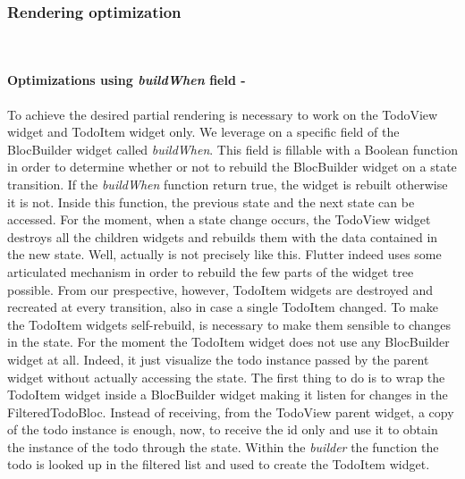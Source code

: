 \subsubsection{Rendering optimization}  \label{par:todo_app_inherited_widget_introduction}
\hfill\\
\paragraph{Optimizations using \textit{buildWhen }field - }\label{subpar:todo_app_bloc_core_state}
To achieve the desired partial rendering is necessary to work on the TodoView widget and TodoItem widget only. We leverage on a specific field of the BlocBuilder widget called \textit{buildWhen}. This field is fillable with a Boolean function in order to determine whether or not to rebuild the BlocBuilder widget on a state transition. If the \textit{buildWhen} function return true, the widget is rebuilt otherwise it is not. Inside this function,  the previous state and the next state can be accessed. For the moment, when a state change occurs, the TodoView widget destroys all the children widgets and rebuilds them with the data contained in the new state. Well, actually is not precisely like this. Flutter indeed uses some articulated mechanism in order to rebuild the few parts of the widget tree possible. From our prespective, however, TodoItem widgets are destroyed and recreated at every transition, also in case a single TodoItem changed. To make the TodoItem widgets self-rebuild,  is necessary to make them sensible to changes in the state. For the moment the TodoItem widget does not use any BlocBuilder widget at all. Indeed, it just visualize the todo instance passed by the parent widget without actually accessing the state. The first thing to do  is to wrap the TodoItem widget inside a BlocBuilder widget making it listen for changes in the FilteredTodoBloc. Instead of receiving, from the TodoView parent widget, a copy of the todo instance is enough, now, to receive the id only and use it to obtain the instance of the todo through the state. Within the \textit{builder} the function the todo is looked up in the filtered list and used to create the TodoItem widget. 
